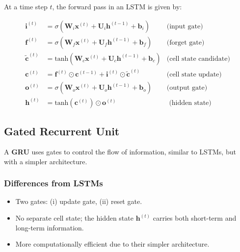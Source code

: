 At a time step $t$, the forward pass in an LSTM is given by:

\begin{align*}
  \mathbf{i}^{(t)} &= \sigma(\mathbf{W}_i \mathbf{x}^{(t)} + \mathbf{U}_i \mathbf{h}^{(t-1)} + \mathbf{b}_i) & \text{(input gate)} \\
  \mathbf{f}^{(t)} &= \sigma(\mathbf{W}_f \mathbf{x}^{(t)} + \mathbf{U}_f \mathbf{h}^{(t-1)} + \mathbf{b}_f) & \text{(forget gate)} \\
  \tilde{\mathbf{c}}^{(t)} &= \text{tanh}(\mathbf{W}_c \mathbf{x}^{(t)} + \mathbf{U}_c \mathbf{h}^{(t-1)} + \mathbf{b}_c) & \text{(cell state candidate)} \\
  \mathbf{c}^{(t)} &= \mathbf{f}^{(t)} \odot \mathbf{c}^{(t-1)} + \mathbf{i}^{(t)} \odot \tilde{\mathbf{c}}^{(t)} & \text{(cell state update)} \\
  \mathbf{o}^{(t)} &= \sigma(\mathbf{W}_o \mathbf{x}^{(t)} + \mathbf{U}_o \mathbf{h}^{(t-1)} + \mathbf{b}_o) & \text{(output gate)}\\
  \mathbf{h}^{(t)} &= \text{tanh}(\mathbf{c}^{(t)}) \odot \mathbf{o}^{(t)} &\text{ (hidden state)}
\end{align*}


\subsection*{Gated Recurrent Unit}

A \textbf{GRU} uses gates to control the flow of information, similar to LSTMs, but with a simpler architecture.

\subsubsection*{Differences from LSTMs}
\begin{itemize}
  \item Two gates: (i) update gate, (ii) reset gate.
  \item No separate cell state; the hidden state $\mathbf{h}^{(t)}$ carries both short-term and long-term information.
  \item More computationally efficient due to their simpler architecture.
\end{itemize}

